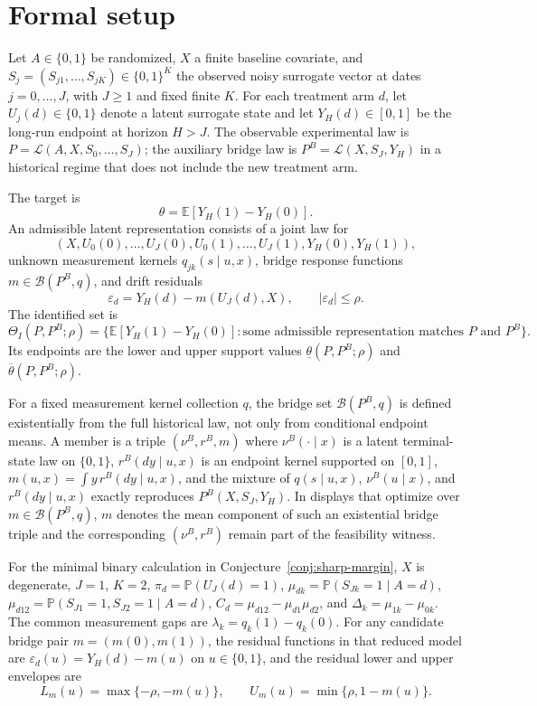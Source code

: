 \documentclass[11pt]{article}
\newcommand{\E}{\mathbb{E}}
\renewcommand{\Pr}{\mathbb{P}}
\theoremstyle{definition}
\theoremstyle{plain}
\theoremstyle{remark}
\begin{document}
\section{Formal setup}
Let \(A\in\{0,1\}\) be randomized, \(X\) a finite baseline covariate, and \(S_j=(S_{j1},\ldots,S_{jK})\in\{0,1\}^K\) the observed noisy surrogate vector at dates \(j=0,\ldots,J\), with \(J\ge1\) and fixed finite \(K\).  For each treatment arm \(d\), let \(U_j(d)\in\{0,1\}\) denote a latent surrogate state and let \(Y_H(d)\in[0,1]\) be the long-run endpoint at horizon \(H>J\).  The observable experimental law is \(P=\mathcal{L}(A,X,S_0,\ldots,S_J)\); the auxiliary bridge law is \(P^B=\mathcal{L}(X,S_J,Y_H)\) in a historical regime that does not include the new treatment arm.

The target is
\[
  \theta=\E[Y_H(1)-Y_H(0)].
\]
An admissible latent representation consists of a joint law for
\[
  (X,U_0(0),\ldots,U_J(0),U_0(1),\ldots,U_J(1),Y_H(0),Y_H(1)),
\]
unknown measurement kernels \(q_{jk}(s\mid u,x)\), bridge response functions \(m\in\mathcal{B}(P^B,q)\), and drift residuals
\[
  \varepsilon_d=Y_H(d)-m(U_J(d),X),\qquad |\varepsilon_d|\le\rho .
\]
The identified set is
\[
  \Theta_I(P,P^B;\rho)=
  \{\E[Y_H(1)-Y_H(0)] : \text{some admissible representation matches }P\text{ and }P^B\}.
\]
Its endpoints are the lower and upper support values \(\underline\theta(P,P^B;\rho)\) and \(\overline\theta(P,P^B;\rho)\).

For a fixed measurement kernel collection \(q\), the bridge set \(\mathcal{B}(P^B,q)\) is defined existentially from the full historical law, not only from conditional endpoint means.  A member is a triple \((\nu^B,r^B,m)\) where \(\nu^B(\cdot\mid x)\) is a latent terminal-state law on \(\{0,1\}\), \(r^B(dy\mid u,x)\) is an endpoint kernel supported on \([0,1]\), \(m(u,x)=\int y\,r^B(dy\mid u,x)\), and the mixture of \(q(s\mid u,x)\), \(\nu^B(u\mid x)\), and \(r^B(dy\mid u,x)\) exactly reproduces \(P^B(X,S_J,Y_H)\).  In displays that optimize over \(m\in\mathcal{B}(P^B,q)\), \(m\) denotes the mean component of such an existential bridge triple and the corresponding \((\nu^B,r^B)\) remain part of the feasibility witness.

For the minimal binary calculation in Conjecture~\ref{conj:sharp-margin}, \(X\) is degenerate, \(J=1\), \(K=2\), \(\pi_d=\Pr(U_J(d)=1)\), \(\mu_{dk}=\Pr(S_{Jk}=1\mid A=d)\), \(\mu_{d12}=\Pr(S_{J1}=1,S_{J2}=1\mid A=d)\), \(C_d=\mu_{d12}-\mu_{d1}\mu_{d2}\), and \(\Delta_k=\mu_{1k}-\mu_{0k}\).  The common measurement gaps are \(\lambda_k=q_k(1)-q_k(0)\).  For any candidate bridge pair \(m=(m(0),m(1))\), the residual functions in that reduced model are \(\varepsilon_d(u)=Y_H(d)-m(u)\) on \(u\in\{0,1\}\), and the residual lower and upper envelopes are
\[
  L_m(u)=\max\{-\rho,-m(u)\},\qquad U_m(u)=\min\{\rho,1-m(u)\}.
\]
\end{document}
